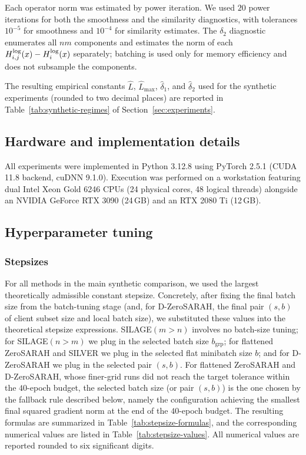 \documentclass{article}
\theoremstyle{plain}
\newcommand{\algname}[1]{{\sf\scalefont{0.88}\color{mydarkgreen}#1}\xspace}
\def\algname#1{#1}%
\begin{document}
Each operator norm was estimated by power iteration. We used $20$ power iterations for both the smoothness and the similarity diagnostics, with tolerances $10^{-5}$ for smoothness and $10^{-4}$ for similarity estimates. The $\delta_2$ diagnostic enumerates all $nm$ components and estimates the norm of each $H_{i,j}^{\rm log}(x)-H_i^{\rm log}(x)$ separately; batching is used only for memory efficiency and does not subsample the components.

The resulting empirical constants $\widehat L$, $\widehat L_{\max}$, $\widehat\delta_1$, and $\widehat\delta_2$ used for the synthetic experiments (rounded to two decimal places) are reported in Table~\ref{tab:synthetic-regimes} of Section~\ref{sec:experiments}.

\subsection{Hardware and implementation details}

All experiments were implemented in Python 3.12.8 using PyTorch 2.5.1 (CUDA 11.8 backend, cuDNN 9.1.0). Execution was performed on a workstation featuring dual Intel Xeon Gold 6246 CPUs (24 physical cores, 48 logical threads) alongside an NVIDIA GeForce RTX 3090 (24\,GB) and an RTX 2080 Ti (12\,GB).

%

\subsection{Hyperparameter tuning}
\label{sec:hyperparameter_tuning}

\subsubsection{Stepsizes}

For all methods in the main synthetic comparison, we used the largest theoretically admissible constant stepsize. Concretely, after fixing the final batch size from the batch-tuning stage (and, for \algname{D-ZeroSARAH}, the final pair $(s,b)$ of client subset size and local batch size), we substituted these values into the theoretical stepsize expressions. \algname{SILAGE}$(m>n)$ involves no batch-size tuning; for \algname{SILAGE}$(n>m)$ we plug in the selected batch size $b_{\mathrm{grp}}$; for flattened \algname{ZeroSARAH} and \algname{SILVER} we plug in the selected flat minibatch size $b$; and for \algname{D-ZeroSARAH} we plug in the selected pair $(s,b)$. For flattened \algname{ZeroSARAH} and \algname{D-ZeroSARAH}, whose finer-grid runs did not reach the target tolerance within the $40$-epoch budget, the selected batch size (or pair $(s,b)$) is the one chosen by the fallback rule described below, namely the configuration achieving the smallest final squared gradient norm at the end of the $40$-epoch budget. The resulting formulas are summarized in Table~\ref{tab:stepsize-formulas}, and the corresponding numerical values are listed in Table~\ref{tab:stepsize-values}. All numerical values are reported rounded to six significant digits.
\end{document}
